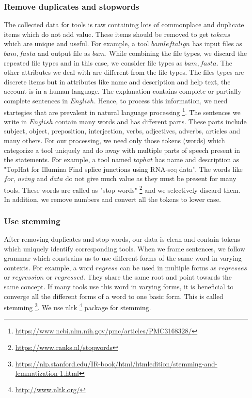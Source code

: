 \subsubsection{Remove duplicates and stopwords}
    The collected data for tools is raw containing lots of commonplace and duplicate items which do not add value. These items should be removed to get $tokens$ which are unique and useful. For example, a tool $bamleftalign$ has input files as $bam, fasta$ and output file as $bam$. While combining the file types, we discard the repeated file types and in this case, we consider file types as $bam, fasta$. The other attributes we deal with are different from the file types. The files types are discrete items but in attributes like name and description and help text, the account is in a human language. The explanation contains complete or partially complete sentences in $English$. Hence, to process this information, we need startegies that are prevalent in natural language processing \footnote{\url{https://www.ncbi.nlm.nih.gov/pmc/articles/PMC3168328/}}. The sentences we write in $English$ contain many words and has different parts. These parts include subject, object, preposition, interjection, verbs, adjectives, adverbs, articles and many others. For our processing, we need only those tokens (words) which categorize a tool uniquely and do away with multiple parts of speech present in the statements. For example, a tool named $tophat$ has name and description as "TopHat for Illumina Find splice junctions using RNA-seq data". The words like $for$, $using$ and $data$ do not give much value as they must be present for many tools. These words are called as "stop words" \footnote{\url{https://www.ranks.nl/stopwords}} and we selectively discard them. In addition, we remove numbers and convert all the tokens to lower case.
  
 
\subsubsection{Use stemming}
After removing duplicates and stop words, our data is clean and contain tokens which uniquely identify corresponding tools. When we frame sentences, we follow grammar which constrains us to use different forms of the same word in varying contexts. For example, a word $regress$ can be used in multiple forms as $regresses$ or $regression$ or $regressed$. They share the same root and point towards the same concept. If many tools use this word in varying forms, it is beneficial to converge all the different forms of a word to one basic form. This is called stemming \footnote{\url{https://nlp.stanford.edu/IR-book/html/htmledition/stemming-and-lemmatization-1.html}}. We use nltk \footnote{\url{http://www.nltk.org/}} package for stemming.

